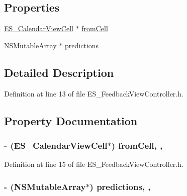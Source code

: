 \subsection*{Properties}
\begin{DoxyCompactItemize}
\item 
\hyperlink{interface_e_s___calendar_view_cell}{E\+S\+\_\+\+Calendar\+View\+Cell} $\ast$ \hyperlink{interface_e_s___feedback_view_controller_aeb023c4fb7e42f1e7067333b6dc9521d}{from\+Cell}
\item 
N\+S\+Mutable\+Array $\ast$ \hyperlink{interface_e_s___feedback_view_controller_a242e2d41e2c7537330d7e7b8fe02dfa4}{predictions}
\end{DoxyCompactItemize}


\subsection{Detailed Description}


Definition at line 13 of file E\+S\+\_\+\+Feedback\+View\+Controller.\+h.



\subsection{Property Documentation}
\hypertarget{interface_e_s___feedback_view_controller_aeb023c4fb7e42f1e7067333b6dc9521d}{
\subsubsection[{from\+Cell}]{\setlength{\rightskip}{0pt plus 5cm}-\/ ({\bf E\+S\+\_\+\+Calendar\+View\+Cell}$\ast$) from\+Cell\hspace{0.3cm}{\ttfamily [read]}, {\ttfamily [write]}, {\ttfamily [atomic]}}}\label{interface_e_s___feedback_view_controller_aeb023c4fb7e42f1e7067333b6dc9521d}


Definition at line 15 of file E\+S\+\_\+\+Feedback\+View\+Controller.\+h.

\hypertarget{interface_e_s___feedback_view_controller_a242e2d41e2c7537330d7e7b8fe02dfa4}{
\subsubsection[{predictions}]{\setlength{\rightskip}{0pt plus 5cm}-\/ (N\+S\+Mutable\+Array$\ast$) predictions\hspace{0.3cm}{\ttfamily [read]}, {\ttfamily [write]}, {\ttfamily [atomic]}}}\label{interface_e_s___feedback_view_controller_a242e2d41e2c7537330d7e7b8fe02dfa4}


